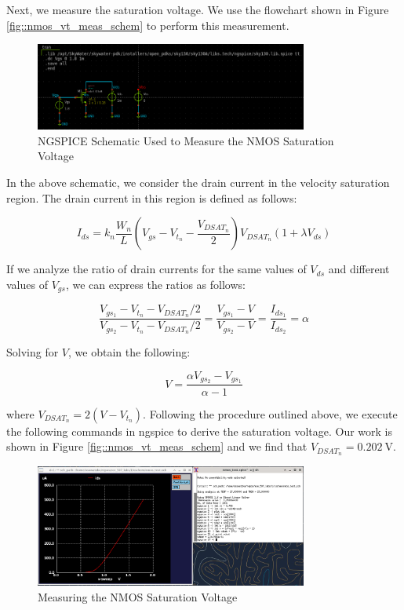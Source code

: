 \documentclass[fleqn]{article}
\begin{document}
	Next, we measure the saturation voltage. We use the flowchart shown in Figure \ref{fig::nmos_vt_meas_schem} to perform this measurement.
	
	\begin{figure}[H]
		\centerline{\includegraphics[width=0.8\textwidth]{nmos_vt_meas_schem.png}}
		\caption{NGSPICE Schematic Used to Measure the NMOS Saturation Voltage}
		\label{fig::nmos_vdsat_meas_schem}
	\end{figure}
	
	 \noindent In the above schematic, we consider the drain current in the velocity saturation region. The drain current in this region is defined as follows:
	
	\begin{equation}
		\label{eq::nmos_sat_current}
		I_{ds} = k_n\frac{W_n}{L}\left(V_{gs} - V_{t_n} - \frac{V_{DSAT_n}}{2}\right)V_{DSAT_n}(1 + {\lambda}V_{ds})
	\end{equation}
	
	\noindent If we analyze the ratio of drain currents for the same values of $V_{ds}$ and different values of $V_{gs}$, we can express the ratios as follows:
	
	\begin{equation}
		\frac{V_{gs_1} - V_{t_n} - V_{DSAT_n}/2}{V_{gs_2} - V_{t_n} - V_{DSAT_n}/2} = \frac{V_{gs_1} - V}{V_{gs_2} - V} = \frac{I_{ds_1}}{I_{ds_2}} = \alpha
	\end{equation}
	
	\noindent Solving for $V$, we obtain the following:
	
	\begin{equation}
		V = \frac{{\alpha}V_{gs_2} - V_{gs_1}}{\alpha - 1}
	\end{equation}
	
	\noindent where $V_{DSAT_n} = 2(V - V_{t_n})$. Following the procedure outlined above, we execute the following commands in ngspice to derive the saturation voltage. Our work is shown in Figure \ref{fig::nmos_vt_meas_schem} and we find that $V_{DSAT_n} = 0.202\ \text{V}$.
	
	\begin{figure}[H]
		\centerline{\includegraphics[width=0.8\textwidth]{nmos_vdsat_meas.png}}
		\caption{Measuring the NMOS Saturation Voltage}
		\label{fig::nmos_vdsat_meas}
	\end{figure}
	
\end{document}
